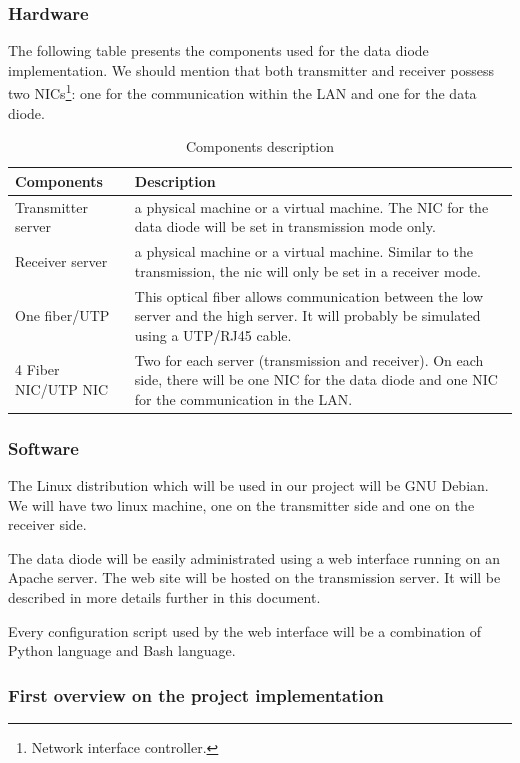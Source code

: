 \documentclass[a4paper,10pt]{article}
\begin{document}
\subsubsection{Hardware}
The following table presents the components used for the data diode implementation. We should mention that both transmitter and receiver possess two NICs\footnote{Network interface controller.}: one for the communication within the LAN and one for the data diode.\bigskip
\begin{table}[!h]
\centering
\begin{tabular}{|p{3cm}|p{10.5cm}|}
	\hline
	\textbf{Components} & \textbf{Description}                 \\
	\hline
	Transmitter server  &  a physical machine or a virtual machine. The NIC for the data diode will be set in transmission mode only. \\
	\hline
	Receiver server  &  a physical machine or a virtual machine. Similar to the transmission, the nic will only be set in a receiver mode.\\
	\hline
	One fiber/UTP & This optical fiber allows communication between the low server and the high server. It will probably be simulated using a UTP/RJ45 cable.\\
	\hline
	4 Fiber NIC/UTP NIC & Two for each server (transmission and receiver). On each side, there will be one NIC for the data diode and one NIC for the communication in the LAN.  \\
	\hline
\end{tabular}
\caption{Components description}
\label{tab:component}
\end{table}
\subsubsection{Software}
The Linux distribution which will be used in our project will be GNU Debian. We will have two linux machine, one on the transmitter side and one on the receiver side. 

The data diode will be easily administrated using a web interface running on an Apache server. The web site will be hosted on the transmission server. It will be described in more details further in this document.

Every configuration script used by the web interface will be a combination of Python language and Bash language.
\subsubsection{First overview on the project implementation}
\end{document}
